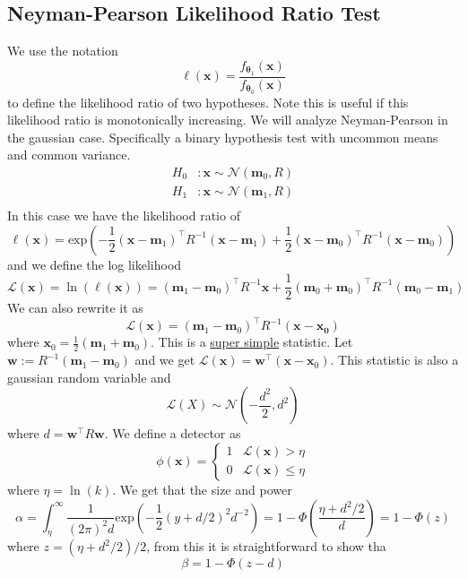 \documentclass[a4paper]{article}
\begin{document}
\subsection*{Neyman-Pearson Likelihood Ratio Test}%
We use the notation
\[
  \ell(\bm{x}) = \frac{f_{\bm{\theta}_1}(\bm{x})}{f_{\bm{\theta}_0}(\bm{x})}
\]
to define the likelihood ratio of two hypotheses. Note this is useful if this likelihood ratio is monotonically increasing. We will analyze Neyman-Pearson in the gaussian case. Specifically a binary hypothesis test with uncommon means and common variance.
\[
  \begin{aligned}
    H_0 &: \bm{x} \sim \mathcal{N} \left( \bm{m}_0, R \right) \\
    H_1 &: \bm{x} \sim \mathcal{N} \left( \bm{m}_1, R \right) \\
  \end{aligned}
\]
In this case we have the likelihood ratio of
\[
  \ell(\bm{x}) = \text{exp} \left( -\frac{1}{2}(\bm{x} - \bm{m}_1)^\top R^{-1} (\bm{x} - \bm{m}_1) + \frac{1}{2}(\bm{x} - \bm{m}_0)^\top R^{-1} (\bm{x} - \bm{m}_0)\right)
\] 
and we define the log likelihood
\[
  \mathcal{L}(\bm{x}) = \ln \left( \ell(\bm{x}) \right)= (\bm{m}_1 - \bm{m}_0)^\top R^{-1} \bm{x} + \frac{1}{2} (\bm{m}_0 + \bm{m}_0)^\top R^{-1}(\bm{m}_0 - \bm{m}_1)
\]
We can also rewrite it as
\[
  \mathcal{L}(\bm{x}) = (\bm{m}_1 - \bm{m}_0)^\top R^{-1} (\bm{x} - \bm{x_0})
\]
where $\bm{x}_0 = \frac{1}{2} (\bm{m}_1 + \bm{m}_0)$. This is a \underline{super simple} statistic. Let $\bm{w} := R^{-1}(\bm{m}_1 - \bm{m}_0)$ and we get $\mathcal{L}(\bm{x}) = \bm{w}^\top (\bm{x} - \bm{x}_0)$. This statistic is also a gaussian random variable and 
\[
  \mathcal{L}(X) \sim \mathcal{N} \left( - \frac{d^2}{2}, d^2 \right)
\]
where $d = \bm{w}^\top R \bm{w}$. We define a detector as
\[
  \phi(\bm{x}) = 
  \begin{cases}
    1 & \mathcal{L}(\bm{x}) > \eta \\
    0 & \mathcal{L}(\bm{x}) \leq \eta
  \end{cases}
\]
where $\eta = \ln(k)$.
We get that the size and power
\[
  \alpha = \int_{\eta}^{\infty} \frac{1}{(2\pi)^2 d} \text{exp} \left( -\frac{1}{2} (y + d/2)^2d^{-2} \right) = 1 - \Phi \left( \frac{\eta + d^2/2}{d} \right) = 1 - \Phi(z)
\]
where $z = (\eta + d^2/2)/2$, from this it is straightforward to show tha
\[
  \beta = 1 - \Phi(z - d)
\]
\end{document}
